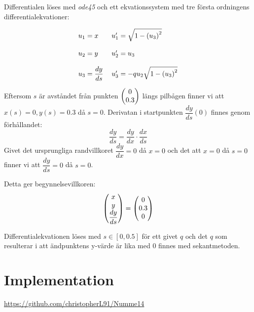 \documentclass[a4paper,11pt,twoside]{article}
\newcommand*\colvec[3][]{
    \begin{pmatrix}\ifx\relax#1\relax\else#1\\\fi#2\\#3\end{pmatrix}
}
\begin{document}
Differentialen löses med \textit{ode45} och ett ekvationssystem med tre första ordningens differentialekvationer:

\begin{align}
\begin{tabular}{ l l }
	$u_1 = x$ 					& $u_1' = \sqrt{1-\left(u_3\right)^2}$\\
	& \\
	$u_2 = y$ 					& $u_2' = u_3$\\
	& \\
	$u_3 = \dfrac{dy}{ds}$ 		& $u_3' = -qu_2\sqrt{1-\left(u_3\right)^2}$
\end{tabular}
\nonumber
\end{align}

Eftersom $s$ är avståndet från punkten $\colvec{0}{0.3}$ längs pilbågen finner vi att $x(s)=0, y(s)=0.3$ då $s=0$. Derivatan i startpunkten $\dfrac{dy}{ds}(0)$ finnes genom förhållandet:
\begin{equation}
\dfrac{dy}{ds}=\dfrac{dy}{dx}\cdotp\dfrac{dx}{ds} \nonumber
\end{equation}
Givet det ursprungliga randvillkoret $\dfrac{dy}{dx}=0$ då $x=0$ och det att $x=0$ då $s=0$ finner vi att $\dfrac{dy}{ds}=0$ då $s=0$.

Detta ger begynnelsevillkoren:
\begin{equation}
\colvec[x]{y}{\dfrac{dy}{ds}}=\colvec[0]{0.3}{0} \nonumber
\end{equation}

Differentialekvationen löses med $s \in [0,0.5]$ för ett givet $q$ och det $q$ som resulterar i att ändpunktens y-värde är lika med $0$ finnes med sekantmetoden.

\section{Implementation}
\href{https://github.com/christopherL91/Numme14}{https://github.com/christopherL91/Numme14}
\end{document}
